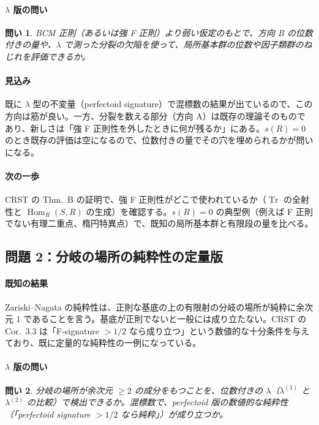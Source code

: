 \documentclass[11pt,a4paper]{ltjsarticle}
\theoremstyle{plain}
\newtheorem{question}{問い}
\theoremstyle{definition}
\theoremstyle{remark}
\theoremstyle{plain}
\newcommand{\Hom}{\operatorname{Hom}}
\newcommand{\Tr}{\operatorname{Tr}}
\begin{document}
\paragraph{$\lambda$ 版の問い}
\begin{question}
BCM 正則（あるいは強 F 正則）より弱い仮定のもとで、方向 B の位数付きの量や、$\lambda$ で測った分裂の欠陥を使って、局所基本群の位数や因子類群のねじれを評価できるか。
\end{question}

\paragraph{見込み}
既に $\lambda$ 型の不変量（perfectoid signature）で混標数の結果が出ているので、この方向は筋が良い。一方、分裂を数える部分（方向 A）は既存の理論そのものであり、新しさは「強 F 正則性を外したときに何が残るか」にある。$s(R) = 0$ のとき既存の評価は空になるので、位数付きの量でその穴を埋められるかが問いになる。

\paragraph{次の一歩}
CRST の Thm.~B の証明で、強 F 正則性がどこで使われているか（$\Tr$ の全射性と $\Hom_R(S,R)$ の生成）を確認する。$s(R) = 0$ の典型例（例えば F 正則でない有理二重点、楕円特異点）で、既知の局所基本群と有限段の量を比べる。

\subsection{問題 2：分岐の場所の純粋性の定量版}

\paragraph{既知の結果}
Zariski--Nagata の純粋性は、正則な基底の上の有限射の分岐の場所が純粋に余次元 $1$ であることを言う。基底が正則でないと一般には成り立たない。CRST の Cor.~3.3 は「F-signature $>1/2$ なら成り立つ」という数値的な十分条件を与えており、既に定量的な純粋性の一例になっている。

\paragraph{$\lambda$ 版の問い}
\begin{question}
分岐の場所が余次元 $\ge2$ の成分をもつことを、位数付きの $\lambda$（$\lambda^{(1)}$ と $\lambda^{(2)}$ の比較）で検出できるか。混標数で、perfectoid 版の数値的な純粋性（「perfectoid signature $>1/2$ なら純粋」）が成り立つか。
\end{question}
\end{document}
